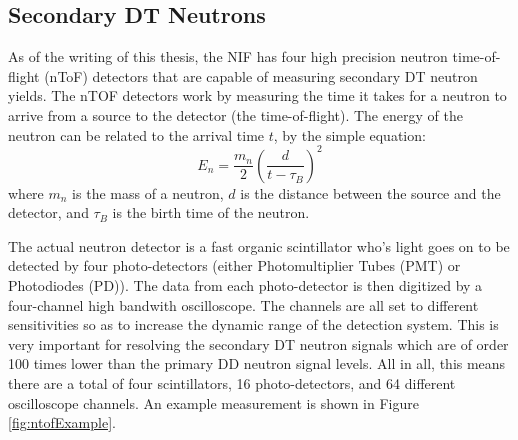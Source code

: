 \subsection{Secondary DT Neutrons}

    As of the writing of this thesis, the NIF has four high precision neutron time-of-flight (nToF) detectors that are capable of measuring secondary DT neutron yields. The nTOF detectors work by measuring the time it takes for a neutron to arrive from a source to the detector (the time-of-flight). The energy of the neutron can be related to the arrival time $t$, by the simple equation:
    \begin{equation}
        E_n = \frac{m_n}{2} \left(\frac{d}{t-\tau_B}\right)^2
    \end{equation}
    where $m_n$ is the mass of a neutron, $d$ is the distance between the source and the detector, and $\tau_B$ is the birth time of the neutron. 
    
    The actual neutron detector is a fast organic scintillator who's light goes on to be detected by four photo-detectors (either Photomultiplier Tubes (PMT) or Photodiodes (PD)). The data from each photo-detector is then digitized by a four-channel high bandwith oscilloscope. The channels are all set to different sensitivities so as to increase the dynamic range of the detection system. This is very important for resolving the secondary DT neutron signals which are of order 100 times lower than the primary DD neutron signal levels. All in all, this means there are a total of four scintillators, 16 photo-detectors, and 64 different oscilloscope channels. An example measurement is shown in Figure \ref{fig:ntofExample}.
    

